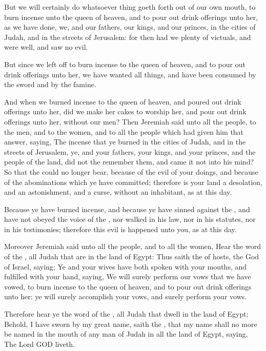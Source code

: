 \verse But we will certainly do whatsoever thing goeth forth out of our own mouth, to burn incense unto the queen of heaven, and to pour out drink offerings unto her, as we have done, we, and our fathers, our kings, and our princes, in the cities of Judah, and in the streets of Jerusalem: for then had we plenty of victuals, and were well, and saw no evil.

\verse But since we left off to burn incense to the queen of heaven, and to pour out drink offerings unto her, we have wanted all things, and have been consumed by the sword and by the famine.

\verse And when we burned incense to the queen of heaven, and poured out drink offerings unto her, did we make her cakes to worship her, and pour out drink offerings unto her, without our men?  \verse Then Jeremiah said unto all the people, to the men, and to the women, and to all the people which had given him that answer, saying, \verse The incense that ye burned in the cities of Judah, and in the streets of Jerusalem, ye, and your fathers, your kings, and your princes, and the people of the land, did not the \LORD remember them, and came it not into his mind?  \verse So that the \LORD could no longer bear, because of the evil of your doings, and because of the abominations which ye have committed; therefore is your land a desolation, and an astonishment, and a curse, without an inhabitant, as at this day.

\verse Because ye have burned incense, and because ye have sinned against the \LORD, and have not obeyed the voice of the \LORD, nor walked in his law, nor in his statutes, nor in his testimonies; therefore this evil is happened unto you, as at this day.

\verse Moreover Jeremiah said unto all the people, and to all the women, Hear the word of the \LORD, all Judah that are in the land of Egypt: \verse Thus saith the \LORD of hosts, the God of Israel, saying; Ye and your wives have both spoken with your mouths, and fulfilled with your hand, saying, We will surely perform our vows that we have vowed, to burn incense to the queen of heaven, and to pour out drink offerings unto her: ye will surely accomplish your vows, and surely perform your vows.

\verse Therefore hear ye the word of the \LORD, all Judah that dwell in the land of Egypt; Behold, I have sworn by my great name, saith the \LORD, that my name shall no more be named in the mouth of any man of Judah in all the land of Egypt, saying, The Lord GOD liveth.


